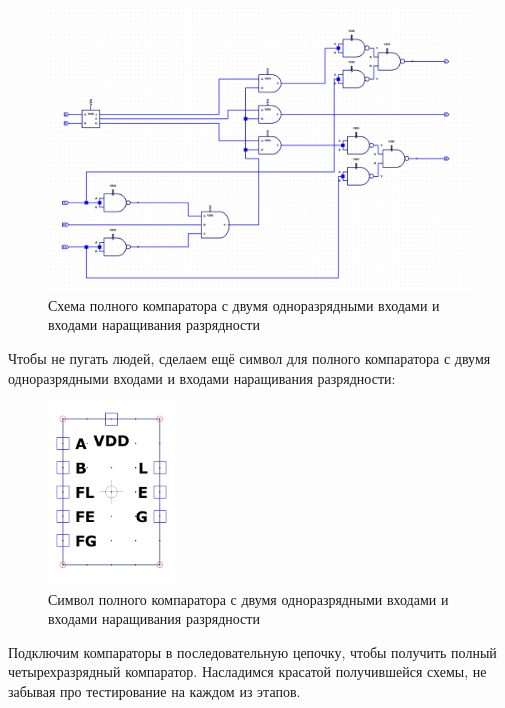 \documentclass[12pt,onecolumn]{article}
\begin{document}
\begin{figure}[H]
    \centering
    \includegraphics[width=\textwidth]{image/full-comparator-seq.png}
    \caption{Схема полного компаратора с двумя одноразрядными входами и входами наращивания разрядности}
\end{figure}
Чтобы не пугать людей, сделаем ещё символ для полного компаратора с двумя одноразрядными входами и входами наращивания разрядности:
\begin{figure}[H]
    \centering
    \includegraphics[width=0.3\textwidth]{image/full-comparator-seq-sym.png}
    \caption{Символ полного компаратора с двумя одноразрядными входами и входами наращивания разрядности}
\end{figure}
Подключим компараторы в последовательную цепочку, чтобы получить полный четырехразрядный компаратор.
Насладимся красатой получившейся схемы, не забывая про тестирование на каждом из этапов.
\end{document}
